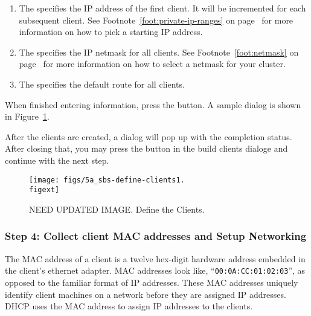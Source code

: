 \begin{enumerate}
\item The  specifies the IP address of the first
  client. It will be incremented for each subsequent client.  See
  Footnote~\ref{foot:private-ip-ranges} on
  page~\pageref{foot:private-ip-ranges} for more information on how to
  pick a starting IP address.
  
\item The  specifies the IP netmask for all
  clients.  See Footnote~\ref{foot:netmask} on
  page~\pageref{foot:netmask} for more information on how to select a
  netmask for your cluster.
  
\item The  specifies the default route for all
  clients.

\end{enumerate}
  
When finished entering information, press the  button.
A sample dialog is shown in Figure~\ref{fig:detailed-define-clients}. 

After the clients are created, a dialog will pop up with the
completion status. After closing that, you may press the
 button in the build clients dialoge and continue with
the next step.

\begin{figure}[htbp]
  \begin{center}
    \texttt{[image: figs/5a\_sbs-define-clients1.\\figext]}
    \caption{NEED UPDATED IMAGE. Define the Clients.}
    \label{fig:detailed-define-clients}
  \end{center}
\end{figure}
    

\subsubsection{Step 4: Collect client MAC addresses and Setup Networking} 
\label{det:setupnetwork}

The MAC address of a client is a twelve hex-digit hardware address
embedded in the client's ethernet adapter. MAC addresses look like,
``{\tt 00:0A:CC:01:02:03}'', as opposed to the familiar format of IP
addresses. These MAC addresses uniquely identify client machines on a
network before they are assigned IP addresses. DHCP uses the MAC
address to assign IP addresses to the clients.

